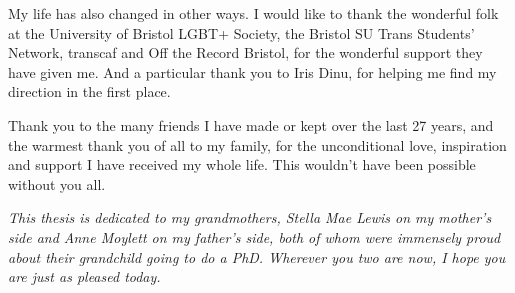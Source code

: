 My life has also changed in other ways. I would like to thank the wonderful folk at the University of Bristol LGBT+ Society, the Bristol SU Trans Students' Network, transcaf and Off the Record Bristol, for the wonderful support they have given me. And a particular thank you to Iris Dinu, for helping me find my direction in the first place.

Thank you to the many friends I have made or kept over the last 27 years, and the warmest thank you of all to my family, for the unconditional love, inspiration and support I have received my whole life. This wouldn't have been possible without you all.

\vspace{1cm}

\emph{This thesis is dedicated to my grandmothers, Stella Mae Lewis on my mother's side and Anne Moylett on my father's side, both of whom were immensely proud about their grandchild going to do a PhD. Wherever you two are now, I hope you are just as pleased today.}
